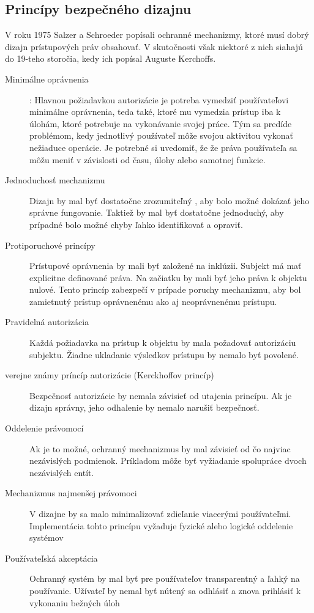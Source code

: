 \subsection{Princípy bezpečného dizajnu}
\label{sec:bezpecny dizajn}
V roku 1975 Salzer a Schroeder popísali ochranné mechanizmy, ktoré musí dobrý dizajn prístupových práv obsahovať. V skutočnosti však niektoré z nich siahajú do 19-teho storočia, kedy ich popísal Auguste Kerchoffs. 

\begin{description}
	\item[Minimálne oprávnenia] : Hlavnou požiadavkou autorizácie je potreba vymedziť používateľovi minimálne oprávnenia, teda také, ktoré mu vymedzia prístup iba k úlohám, ktoré potrebuje na vykonávanie svojej práce. Tým sa predíde problémom, kedy jednotlivý používateľ môže svojou aktivitou vykonať nežiaduce operácie. Je potrebné si uvedomiť, že že práva používateľa sa môžu meniť v závislosti od  času, úlohy alebo samotnej funkcie. 
	\item[Jednoduchosť mechanizmu] Dizajn by mal byť dostatočne zrozumiteľný , aby bolo možné dokázať jeho správne fungovanie. Taktiež by mal byť dostatočne jednoduchý, aby prípadné bolo možné chyby ľahko identifikovať a opraviť.
	\item[Protiporuchové princípy] Prístupové oprávnenia by mali byť založené na inklúzii. Subjekt má mať explicitne definované práva. Na začiatku by mali byť jeho práva k objektu nulové. Tento princíp zabezpečí v prípade poruchy mechanizmu, aby bol zamietnutý prístup oprávnenému ako aj neoprávnenému prístupu. 
	\item[Pravidelná autorizácia] Každá požiadavka na prístup k objektu by mala požadovať autorizáciu subjektu. Žiadne ukladanie výsledkov prístupu by nemalo byť povolené.
	\item[verejne známy príncíp autorizácie (Kerckhoffov princíp)] Bezpečnosť autorizácie by nemala závisieť od utajenia princípu. Ak je dizajn správny, jeho odhalenie by nemalo narušiť bezpečnosť.
	\item[Oddelenie právomocí] Ak je to možné, ochranný mechanizmus by mal závisieť od čo najviac nezávislých podmienok. Príkladom môže byť vyžiadanie spolupráce dvoch nezávislých entít. 
	\item[Mechanizmus najmenšej právomoci] V dizajne by sa malo minimalizovať zdieľanie viacerými používateľmi. Implementácia tohto princípu vyžaduje fyzické alebo logické oddelenie systémov
	\item[Používateľská akceptácia] Ochranný systém by mal byť pre používateľov transparentný a ľahký na používanie. Užívateľ by nemal byť nútený sa odhlásiť a znova prihlásiť k vykonaniu bežných úloh
\end{description}


